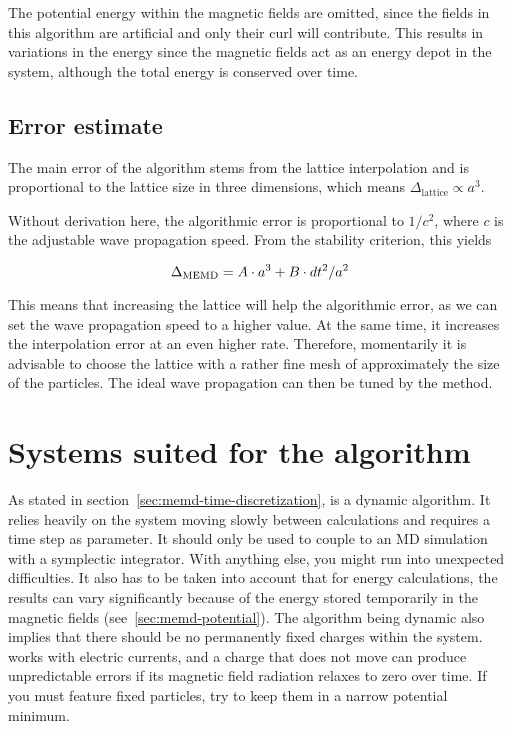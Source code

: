 The potential energy within the magnetic fields are omitted, since the fields in this algorithm are artificial and only their curl will contribute. This results in variations in the energy since the magnetic fields act as an energy depot in the system, although the total energy is conserved over time.

\subsection{Error estimate}
\label{sec:memd-error}

The main error of the \memd{} algorithm stems from the lattice interpolation and is proportional to the lattice size in three dimensions, which means $\Delta_\text{lattice} \propto a^3$.

Without derivation here, the algorithmic error is proportional to $1/c^2$, where $c$ is the adjustable wave propagation speed. From the stability criterion, this yields

\begin{equation}
\Delta_\text{\memd{}} = A\cdot a^3 + B\cdot dt^2/a^2
\label{eq:memderror}
\end{equation}

This means that increasing the lattice will help the algorithmic error, as we can set the wave propagation speed to a higher value. At the same time, it increases the interpolation error at an even higher rate. Therefore, momentarily it is advisable to choose the lattice with a rather fine mesh of approximately the size of the particles. The ideal wave propagation can then be tuned by the method.


\section{Systems suited for the algorithm}
\label{sec:memd-suited-systems}

As stated in section~\ref{sec:memd-time-discretization}, \memd{} is a dynamic algorithm. It relies heavily on the system moving slowly between calculations and requires a time step as parameter. It should only be used to couple to an MD simulation with a symplectic integrator. With anything else, you might run into unexpected difficulties. It also has to be taken into account that for energy calculations, the results can vary significantly because of the energy stored temporarily in the magnetic fields (see~\ref{sec:memd-potential}). The algorithm being dynamic also implies that there should be no permanently fixed charges within the system. \memd{} works with electric currents, and a charge that does not move can produce unpredictable errors if its magnetic field radiation relaxes to zero over time. If you must feature fixed particles, try to keep them in a narrow potential minimum.

